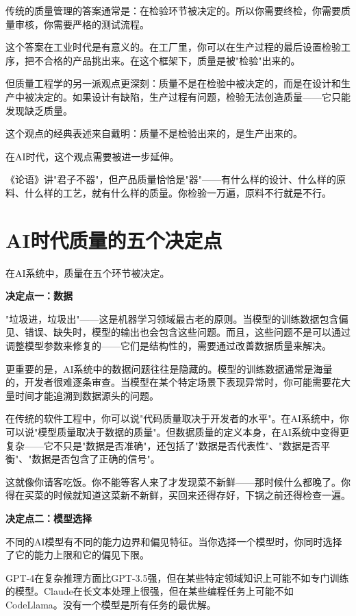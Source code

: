 传统的质量管理的答案通常是：在检验环节被决定的。所以你需要终检，你需要质量审核，你需要严格的测试流程。

这个答案在工业时代是有意义的。在工厂里，你可以在生产过程的最后设置检验工序，把不合格的产品挑出来。在这个框架下，质量是被"检验"出来的。

但质量工程学的另一派观点更深刻：质量不是在检验中被决定的，而是在设计和生产中被决定的。如果设计有缺陷，生产过程有问题，检验无法创造质量——它只能发现缺乏质量。

这个观点的经典表述来自戴明：质量不是检验出来的，是生产出来的。

在AI时代，这个观点需要被进一步延伸。

《论语》讲"君子不器"，但产品质量恰恰是"器"——有什么样的设计、什么样的原料、什么样的工艺，就有什么样的质量。你检验一万遍，原料不行就是不行。

\section{AI时代质量的五个决定点}


在AI系统中，质量在五个环节被决定。

\textbf{决定点一：数据}

"垃圾进，垃圾出"——这是机器学习领域最古老的原则。当模型的训练数据包含偏见、错误、缺失时，模型的输出也会包含这些问题。而且，这些问题不是可以通过调整模型参数来修复的——它们是结构性的，需要通过改善数据质量来解决。

更重要的是，AI系统中的数据问题往往是隐藏的。模型的训练数据通常是海量的，开发者很难逐条审查。当模型在某个特定场景下表现异常时，你可能需要花大量时间才能追溯到数据源头的问题。

在传统的软件工程中，你可以说"代码质量取决于开发者的水平"。在AI系统中，你可以说"模型质量取决于数据的质量"。但数据质量的定义本身，在AI系统中变得更复杂——它不只是"数据是否准确"，还包括了"数据是否代表性"、"数据是否平衡"、"数据是否包含了正确的信号"。

这就像你请客吃饭。你不能等客人来了才发现菜不新鲜——那时候什么都晚了。你得在买菜的时候就知道这菜新不新鲜，买回来还得存好，下锅之前还得检查一遍。

\textbf{决定点二：模型选择}

不同的AI模型有不同的能力边界和偏见特征。当你选择一个模型时，你同时选择了它的能力上限和它的偏见下限。

GPT-4在复杂推理方面比GPT-3.5强，但在某些特定领域知识上可能不如专门训练的模型。Claude在长文本处理上很强，但在某些编程任务上可能不如CodeLlama。没有一个模型是所有任务的最优解。

